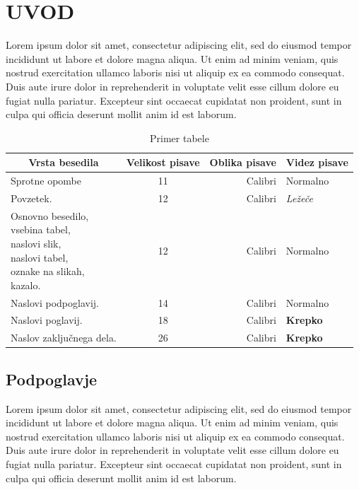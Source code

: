 \documentclass[slovene,openany,a4paper,12pt]{book}
\begin{document}
\newpage
\pagestyle{mainpage}

\chapter{UVOD}
Lorem ipsum dolor sit amet, consectetur adipiscing elit, sed do eiusmod tempor incididunt ut labore et dolore magna aliqua. Ut enim ad minim veniam, quis nostrud exercitation ullamco laboris nisi ut aliquip ex ea commodo consequat. Duis aute irure dolor in reprehenderit in voluptate velit esse cillum dolore eu fugiat nulla pariatur. Excepteur sint occaecat cupidatat non proident, sunt in culpa qui officia deserunt mollit anim id est laborum.

\begin{table}[h]
\renewcommand{\arraystretch}{2.0}
\setlength\extrarowheight{2pt}
\label{tab:tabela1.1}
\caption{Primer tabele}
\vspace*{5mm}
\centering
\begin{tabular}{|l|c|r|l|}
 \hline
 \multicolumn{1}{|c|}{Vrsta besedila} & \multicolumn{1}{|c|}{Velikost pisave} & \multicolumn{1}{|c|}{Oblika pisave} & \multicolumn{1}{|c|}{Videz pisave} \\ \hline
 Sprotne opombe & 11 & Calibri & Normalno  \\[6pt] \hline
 Povzetek. & 12 & Calibri & \textit{Ležeče}  \\[6pt] \hline
\makecell[l]{Osnovno besedilo, \\ vsebina tabel, \\ naslovi slik, \\ naslovi tabel, \\ oznake na slikah, \\ kazalo.} & 12 & Calibri & Normalno \\ \hline
 Naslovi podpoglavij. & 14 & Calibri & \Large{Normalno}  \\[6pt] \hline
 Naslovi poglavij. & 18 & Calibri & \LARGE{\textbf{Krepko}}  \\[18pt] \hline
 Naslov zaključnega dela. & 26 & Calibri & \Huge{\textbf{Krepko}} \\[24pt] \hline

\end{tabular}
\end{table}

\section{Podpoglavje}
Lorem ipsum dolor sit amet, consectetur adipiscing elit, sed do eiusmod tempor incididunt ut labore et dolore magna aliqua. Ut enim ad minim veniam, quis nostrud exercitation ullamco laboris nisi ut aliquip ex ea commodo consequat. Duis aute irure dolor in reprehenderit in voluptate velit esse cillum dolore eu fugiat nulla pariatur. Excepteur sint occaecat cupidatat non proident, sunt in culpa qui officia deserunt mollit anim id est laborum.
\end{document}
